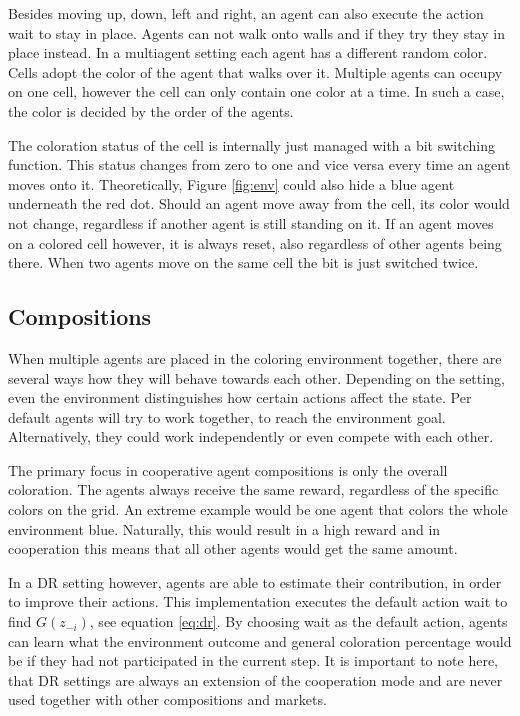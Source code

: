 Besides moving up, down, left and right, an agent can also execute the action wait to stay in place. Agents can not walk onto walls and if they try they stay in place instead. In a multiagent setting each agent has a different random color. Cells adopt the color of the agent that walks over it. Multiple agents can occupy on one cell, however the cell can only contain one color at a time. In such a case, the color is decided by the order of the agents. 

The coloration status of the cell is internally just managed with a bit switching function. This status changes from zero to one and vice versa every time an agent moves onto it. Theoretically, Figure \ref{fig:env} could also hide a blue agent underneath the red dot. Should an agent move away from the cell, its color would not change, regardless if another agent is still standing on it. If an agent moves on a colored cell however, it is always reset, also regardless of other agents being there. When two agents move on the same cell the bit is just switched twice.

\subsection{Compositions}

When multiple agents are placed in the coloring environment together, there are several ways how they will behave towards each other. Depending on the setting, even the environment distinguishes how certain actions affect the state. Per default agents will try to work together, to reach the environment goal. Alternatively, they could work independently or even compete with each other.

The primary focus in cooperative agent compositions is only the overall coloration. The agents always receive the same reward, regardless of the specific colors on the grid. An extreme example would be one agent that colors the whole environment blue. Naturally, this would result in a high reward and in cooperation this means that all other agents would get the same amount. 

In a DR setting however, agents are able to estimate their contribution, in order to improve their actions. This implementation executes the default action wait to find $G(z_{-i})$, see equation \eqref{eq:dr}. By choosing wait as the default action, agents can learn what the environment outcome and general coloration percentage would be if they had not participated in the current step. It is important to note here, that DR settings are always an extension of the cooperation mode and are never used together with other compositions and markets.

